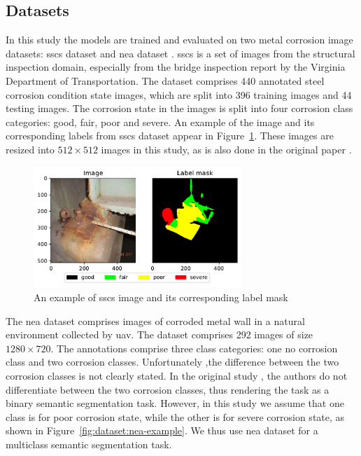 \documentclass[mathematics,article,submit,pdftex,moreauthors]{Definitions/mdpi}
\begin{document}
\subsection{Datasets}
In this study the models are trained and evaluated on two metal corrosion image
datasets: \ac{sscs} dataset \cite{Bianchi2021Dataset,Bianchi2022Journal} and  
\ac{nea} dataset \cite{Liu2023}. \ac{sscs} is a set of 
images from the structural inspection domain,
especially from the bridge inspection report 
by the Virginia Department of Transportation. 
The dataset comprises 440 annotated steel corrosion condition state images,
which are split into 396 training images and 44 testing images.
The corrosion state in the images is split into four corrosion
class categories: good, fair, poor and severe.
An example of the image and its corresponding labels
from \ac{sscs} dataset appear in Figure~\ref{fig:dataset:ccsc-example}.
These images are resized into $512\times 512$ images in this study, as is also done
in the original paper \cite{Bianchi2022Journal}.

\begin{figure}[htbp]
    \begin{center}
    \includegraphics[width=0.7\textwidth]{figures/ccsc-example.pdf}
    \caption{An example of \ac{sscs} image and its corresponding label mask}
    \label{fig:dataset:ccsc-example}
    \end{center}
\end{figure}

The \ac{nea} dataset comprises images of corroded metal wall
in a natural environment collected by \ac{uav}.
The dataset comprises 292 images of size $1280\times 720$.
The annotations comprise three class categories: one no corrosion class
and two corrosion classes. Unfortunately ,the difference
between the two corrosion classes is not clearly stated. 
In the original study \cite{Liu2023}, the authors
do not differentiate between the two corrosion classes,
thus rendering the task as a binary semantic segmentation
task. However, in this study
we assume that one class is for poor corrosion state, 
while the other is for severe corrosion state, as shown
in Figure~\ref{fig:dataset:nea-example}. We thus use 
\ac{nea} dataset for a multiclass semantic
segmentation task.
\end{document}
